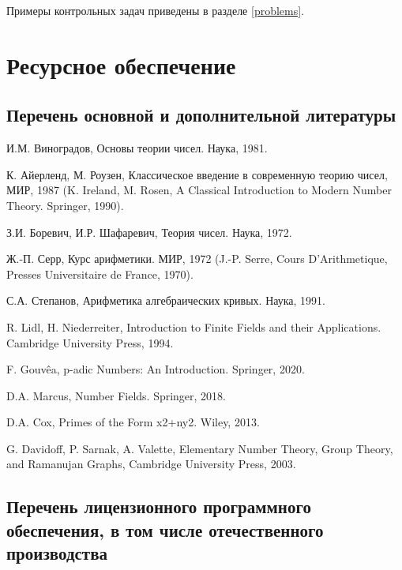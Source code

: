 \documentclass[a4paper, 12pt]{article}
\begin{document}
Примеры контрольных задач приведены в разделе \ref{problems}.

\section{Ресурсное обеспечение}

\subsection{Перечень основной и дополнительной литературы}

\begin{thebibliography}{Serre}
    
    И.М. Виноградов, Основы теории чисел. Наука, 1981.

    К. Айерленд, М. Роузен, Классическое введение в современную теорию чисел, МИР, 1987 (K. Ireland, M. Rosen, A Classical Introduction to Modern Number Theory. Springer, 1990).

    З.И. Боревич, И.Р. Шафаревич, Теория чисел. Наука, 1972.

    Ж.-П. Серр, Курс арифметики. МИР, 1972 (J.-P. Serre, Cours D’Arithmetique, Presses Universitaire de France, 1970).

    С.А. Степанов, Арифметика алгебраических кривых. Наука, 1991.

    R. Lidl, H. Niederreiter, Introduction to Finite Fields and their Applications. Cambridge University Press, 1994.

    F. Gouvêa, p-adic Numbers: An Introduction. Springer, 2020.

    D.A. Marcus, Number Fields. Springer, 2018.

    D.A. Cox, Primes of the Form x2+ny2. Wiley, 2013.

    G. Davidoff, P. Sarnak, A. Valette, Elementary Number Theory, Group Theory, and Ramanujan Graphs, Cambridge University Press, 2003.

\end{thebibliography}

\subsection{Перечень лицензионного программного обеспечения, в том числе отечественного производства}
\end{document}
